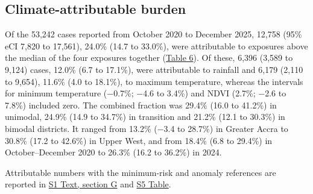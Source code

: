 \documentclass[11pt,a4paper]{article}
\begin{document}
\subsection{Climate-attributable burden}

Of the 53,242 cases reported from October 2020 to December 2025, 12,758 (95\% eCI 7,820 to 17,561), 24.0\% (14.7 to 33.0\%), were attributable to exposures above the median of the four exposures together (\hyperref[table6]{Table 6}). Of these, 6,396 (3,589 to 9,124) cases, 12.0\% (6.7 to 17.1\%), were attributable to rainfall and 6,179 (2,110 to 9,654), 11.6\% (4.0 to 18.1\%), to maximum temperature, whereas the intervals for minimum temperature (−0.7\%; −4.6 to 3.4\%) and NDVI (2.7\%; −2.6 to 7.8\%) included zero. The combined fraction was 29.4\% (16.0 to 41.2\%) in unimodal, 24.9\% (14.9 to 34.7\%) in transition and 21.2\% (12.1 to 30.3\%) in bimodal districts. It ranged from 13.2\% (−3.4 to 28.7\%) in Greater Accra to 30.8\% (17.2 to 42.6\%) in Upper West, and from 18.4\% (6.8 to 29.4\%) in October--December 2020 to 26.3\% (16.2 to 36.2\%) in 2024.

Attributable numbers with the minimum-risk and anomaly references are reported in \hyperref[s1text-g]{S1 Text, section G} and \hyperref[s5table]{S5 Table}.
\end{document}
